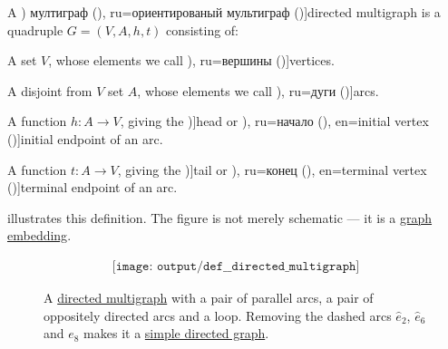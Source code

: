 \begin{definition}\label{def:directed_multigraph}
  A \term[bg=ориентиран (\cite[6]{Мирчев2001Графи}) мултиграф (\cite[7]{Мирчев2001Графи}), ru=ориентированый мультиграф (\cite[16]{Емеличев1990Графы})]{directed multigraph} is a quadruple \( G = (V, A, h, t) \) consisting of:
  \begin{thmenum}[series=def:directed_multigraph]
     A set \( V \), whose elements we call \term[bg=върхове (\cite[6]{Мирчев2001Графи}), ru=вершины (\cite[279]{Емеличев1990Графы})]{vertices}.

     A disjoint from \( V \) set \( A \), whose elements we call \term[bg=дъги (\cite[6]{Мирчев2001Графи}), ru=дуги (\cite[279]{Емеличев1990Графы})]{arcs}.

     A function \( h: A \to V \), giving the \term[en=head (\cite[544]{Rosen1999DiscreteHandbook})]{head} or \term[bg=начален връх (\cite[7]{Мирчев2001Графи}), ru=начало (\cite[279]{Емеличев1990Графы}), en=initial vertex (\cite[28]{Diestel2005Graphs})]{initial endpoint} of an arc.

     A function \( t: A \to V \), giving the \term[en=tail (\cite[544]{Rosen1999DiscreteHandbook})]{tail} or \term[bg=краен връх (\cite[7]{Мирчев2001Графи}), ru=конец (\cite[279]{Емеличев1990Графы}), en=terminal vertex (\cite[28]{Diestel2005Graphs})]{terminal endpoint} of an arc.
  \end{thmenum}

   illustrates this definition. The figure is not merely schematic --- it is a \hyperref[def:graph_geometric_realization/embedding]{graph embedding}.

  \begin{figure}[!ht]
    \begin{equation}\label{eq:fig:def:directed_multigraph}
      \begin{aligned}
        \texttt{[image: output/def\_\_directed\_multigraph]}
      \end{aligned}
    \end{equation}
    \caption{A \hyperref[def:directed_multigraph]{directed multigraph} with a pair of parallel arcs, a pair of oppositely directed arcs and a loop. Removing the dashed arcs \( \widehat{e}_2 \), \( \widehat{e}_6 \) and \( e_8 \) makes it a \hyperref[def:directed_graph]{simple directed graph}.}\label{fig:def:directed_multigraph}
  \end{figure}


\end{definition}

